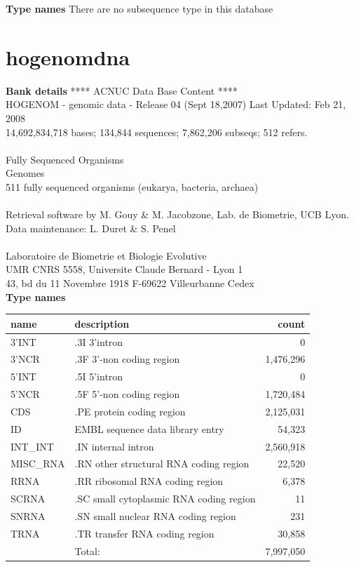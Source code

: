 \documentclass{article}
\begin{document}
\begin{Schunk}
\textbf{Type names}
There are no subsequence type in this database
\section{ hogenomdna }
\textbf{Bank details}
               ****     ACNUC Data Base Content      ****                      \\
 HOGENOM - genomic data - Release 04 (Sept 18,2007) Last Updated: Feb 21, 2008\\
14,692,834,718 bases; 134,844 sequences; 7,862,206 subseqs; 512 refers.\\
                                                                               \\
                        Fully Sequenced Organisms\\
   				Genomes \\
	  511 fully sequenced organisms (eukarya, bacteria, archaea)\\
\\
Retrieval software by M. Gouy \& M. Jacobzone, Lab. de Biometrie, UCB Lyon.\\
Data maintenance: L. Duret \& S. Penel\\
\\
Laboratoire de Biometrie et Biologie Evolutive\\
UMR CNRS 5558, Universite Claude Bernard - Lyon 1 \\
43, bd du 11 Novembre 1918 F-69622 Villeurbanne Cedex\\


\textbf{Type names}
\noindent\begin{tabular}{llr}
\hline \hline
name & description & count \\
\hline
3'INT  &  .3I 3'intron  &  0 \\
3'NCR  &  .3F  3'-non coding region  &  1,476,296 \\
5'INT  &  .5I 5'intron  &  0 \\
5'NCR  &  .5F  5'-non coding region  &  1,720,484 \\
CDS  &  .PE protein coding region  &  2,125,031 \\
ID  &  EMBL sequence data library entry  &  54,323 \\
INT\_INT  &  .IN  internal intron  &  2,560,918 \\
MISC\_RNA  &  .RN other structural RNA coding region  &  22,520 \\
RRNA  &  .RR ribosomal RNA coding region  &  6,378 \\
SCRNA  &  .SC small cytoplasmic RNA coding region  &  11 \\
SNRNA  &  .SN small nuclear RNA coding region  &  231 \\
TRNA  &  .TR transfer RNA coding region  &  30,858 \\
\hline
 & Total: & 7,997,050 \\
\hline \hline
\end{tabular}


\end{Schunk}
\end{document}
